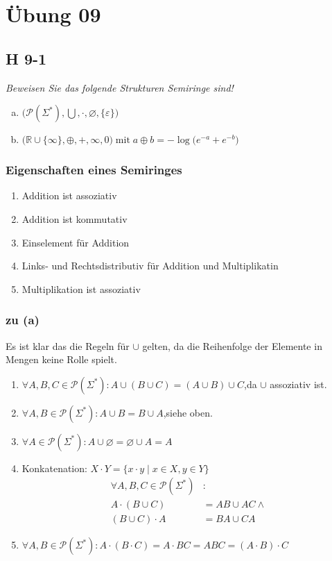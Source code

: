 \documentclass{scrartcl}
\begin{document}
\section{Übung 09}

\subsection{H 9-1}

\textsl{Beweisen Sie das folgende Strukturen \emph{Semiringe} sind!}

\begin{enumerate}[(a)]
    \item $\Big(\mathcal{P}(\Sigma^*), \bigcup, \cdot, \varnothing, \{\varepsilon\} \Big)$
    \item $\Big(\mathbb{R} \cup \{\infty\}, \oplus, +, \infty, 0 \Big) \;\text{mit}\; a \oplus b = -\log\big(e^{-a}+e^{-b}\big)$
\end{enumerate}

\subsubsection{Eigenschaften eines Semiringes}
\begin{enumerate}
    \setlength\itemsep{-1em}
    \item Addition ist assoziativ
    \item Addition ist kommutativ
    \item Einselement für Addition
    \item Links- und Rechtsdistributiv für Addition und Multiplikatin
    \item Multiplikation ist assoziativ
\end{enumerate}

\subsubsection{zu (a)}

\newcommand{\baseset}{\mathcal{P}(\Sigma^*)}
Es ist klar das die Regeln für $\cup$ gelten, da die Reihenfolge der Elemente in Mengen keine Rolle spielt.
\begin{enumerate}
    \item $\forall A, B, C \in \baseset: A \cup (B \cup C) = (A \cup B) \cup C$,\quad{}da $\cup$ assoziativ ist.
    \item $\forall A, B \in \baseset: A \cup B = B \cup A$,\quad{}siehe oben.
    \item $\forall A \in \baseset: A \cup \varnothing = \varnothing \cup A = A$
    \item Konkatenation: $X \cdot Y = \{x \cdot y\;|\;x \in X, y \in Y\}$
    \begin{align*}
        \forall A, B, C \in \baseset&:\\
            A \cdot (B \cup C) &= AB \cup AC \land\\
            (B \cup C) \cdot A &= BA \cup CA
    \end{align*}
    \item $\forall A, B \in \baseset: A \cdot (B \cdot C) = A \cdot BC = ABC = (A \cdot B) \cdot C$
\end{enumerate}
\end{document}
